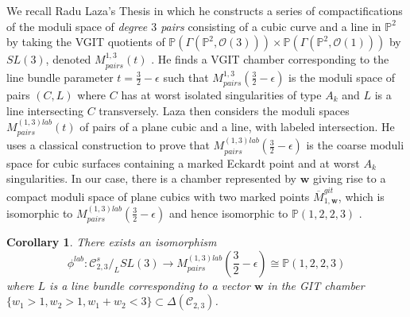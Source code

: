 \documentclass{amsart}
\newcommand{\Pj}{\mathbb{P}}
\newcommand{\mc}{\mathcal}
\numberwithin{equation}{section}
\newtheorem{cor}[prop]{Corollary}
\theoremstyle{definition}
\begin{document}
 We recall Radu Laza's Thesis \cite{Laz06} in which he constructs a series of compactifications of the moduli space of \textit{degree $3$ pairs} consisting of a cubic curve and a line in $\Pj^2$  by taking the VGIT quotients of $\Pj(\Gamma(\Pj^2, \mc{O}(3))) \times \Pj(\Gamma(\Pj^2, \mc{O}(1))) $ by $SL(3)$, denoted $M^{1,3}_{pairs}(t)$ . He finds a VGIT chamber corresponding to the line bundle parameter $t= \frac{3}{2}- \epsilon$ such that $M^{1,3}_{pairs}(\frac{3}{2}- \epsilon)$ is the moduli space of pairs $(C,L)$ where $C$ has at worst isolated singularities of type $A_k$ and $L$ is a line intersecting $C$ transversely. Laza then considers the moduli spaces $M^{(1,3) lab}_{pairs}(t)$ of pairs of a plane cubic and a line, with labeled intersection. He uses a classical construction to prove that $M^{(1,3) lab}_{pairs}(\frac{3}{2}- \epsilon)$ is the coarse moduli space for cubic surfaces containing a marked Eckardt point and at worst $A_k$ singularities.
In our case, there is a chamber represented by $\mathbf{w}$ giving rise to a compact moduli space of plane cubics with two marked points $\overline{M}^{git}_{1, \mathbf{w}}$, which is isomorphic to $M^{(1,3) lab}_{pairs}(\frac{3}{2}- \epsilon)$ and hence isomorphic to $\Pj(1,2,2,3)$ \cite[Corollary 3.15]{Laz06}.

\begin{cor}\label{cor:FromM2toRadu}
    There exists an isomorphism
    \[
       \phi^{lab}:\mc{C}_{2,3}^s \slash_{L} SL(3) \rightarrow M^{(1,3)lab}_{pairs}\left(
       \frac{3}{2}- \epsilon
       \right) 
       \cong 
       \mathbb{P}(1,2,2,3)
    \]
    where $L$ is a line bundle corresponding to a vector $\mathbf{w}$ in the GIT chamber $\{ w_1 > 1, w_2 > 1, w_1 + w_2 < 3\} \subset \Delta(\mc{C}_{2,3})$.
\end{cor}
\end{document}

